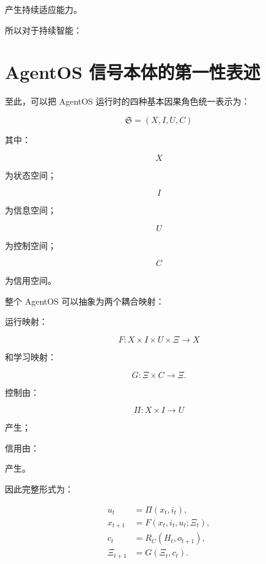 产生持续适应能力。

所以对于持续智能：

\begin{statementbox}
\centering
{}
\end{statementbox}

\section{AgentOS 信号本体的第一性表述}

至此，可以把 AgentOS 运行时的四种基本因果角色统一表示为：

\[
\boxed{
\mathfrak S
=
(
X,I,U,C
)
}
\]

其中：

\[
X
\]

为状态空间；

\[
I
\]

为信息空间；

\[
U
\]

为控制空间；

\[
C
\]

为信用空间。

整个 AgentOS 可以抽象为两个耦合映射：

运行映射：

\[
\boxed{
F:
X\times I\times U\times\Xi
\rightarrow X
}
\]

和学习映射：

\[
\boxed{
G:
\Xi\times C
\rightarrow\Xi.
}
\]

控制由：

\[
\boxed{
\Pi:
X\times I
\rightarrow U
}
\]

产生；

信用由：

\begin{statementbox}
\centering
{}
\end{statementbox}

产生。

因此完整形式为：

\[
\boxed{
\begin{aligned}
u_t
&=
\Pi(x_t,i_t),
\\
x_{t+1}
&=
F(x_t,i_t,u_t;\Xi_t),
\\
c_t
&=
R_C(H_t,o_{t+1}),
\\
\Xi_{t+1}
&=
G(\Xi_t,c_t).
\end{aligned}
}
\]

